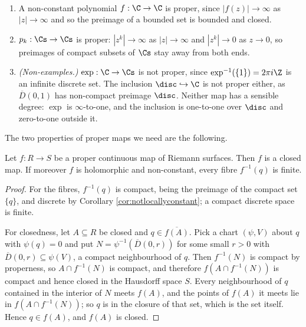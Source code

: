 \begin{example}\
	\begin{enumerate}[label=(\roman*)]
		\item A non-constant polynomial $f : \C \to \C$ is proper, since $|f(z)|\to\infty$
		as $|z|\to\infty$ and so the preimage of a bounded set is bounded and closed.
		\item $p_k : \Cs \to \Cs$ is proper: $|z^k| \to \infty$ as $|z| \to \infty$ and
		$|z^k|\to 0$ as $z \to 0$, so preimages of compact subsets of $\Cs$ stay away from
		both ends.
		\item \emph{(Non-examples.)} $\exp : \C \to \Cs$ is not proper, since
		$\exp^{-1}(\{1\}) = 2\pi i \Z$ is an infinite discrete set. The inclusion
		$\disc \hookrightarrow \C$ is not proper either, as $\overline{D}(0,1)$ has
		non-compact preimage $\disc$. Neither map has a sensible degree: $\exp$ is
		$\infty$-to-one, and the inclusion is one-to-one over $\disc$ and zero-to-one
		outside it.
	\end{enumerate}
\end{example}

The two properties of proper maps we need are the following.

\begin{lemma}\label{lem:properclosed}
	Let $f : R \to S$ be a proper continuous map of Riemann surfaces. Then $f$ is a closed
	map. If moreover $f$ is holomorphic and non-constant, every fibre $f^{-1}(q)$ is finite.
\end{lemma}

\begin{proof}
	For the fibres, $f^{-1}(q)$ is compact, being the preimage of the compact set $\{q\}$,
	and discrete by Corollary \ref{cor:notlocallyconstant}; a compact discrete space is
	finite.

	For closedness, let $A \subseteq R$ be closed and $q \in \overline{f(A)}$. Pick a chart
	$(\psi, V)$ about $q$ with $\psi(q) = 0$ and put
	$N = \psi^{-1}(\overline{D}(0,r))$ for some small $r > 0$ with
	$\overline{D}(0,r)\subseteq\psi(V)$, a compact neighbourhood of $q$. Then $f^{-1}(N)$
	is compact by properness, so $A \cap f^{-1}(N)$ is compact, and therefore
	$f\left(A \cap f^{-1}(N)\right)$ is compact and hence closed in the Hausdorff space $S$.
	Every neighbourhood of $q$ contained in the interior of $N$ meets $f(A)$, and the points
	of $f(A)$ it meets lie in $f(A\cap f^{-1}(N))$; so $q$ is in the closure of that set,
	which is the set itself. Hence $q \in f(A)$, and $f(A)$ is closed.
\end{proof}

